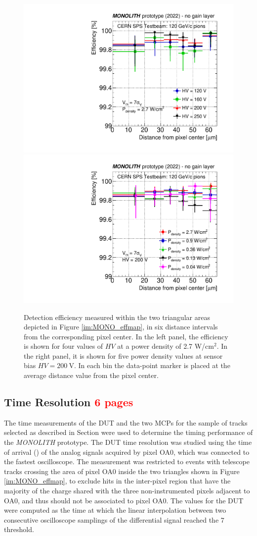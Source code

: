 		\begin{figure}[h]
			\centering 
			\includegraphics[width=.49\textwidth,trim=0 0 0 0]{files/MONOLITH_paper/eff_vs_radius_HV.pdf}
			\includegraphics[width=.49\textwidth,trim=0 0 0 0]{files/MONOLITH_paper/eff_vs_radius_power.pdf}
			\caption{Detection efficiency measured within the two triangular areas depicted in Figure \ref{im:MONO_effmap}, in six distance intervals from the corresponding pixel center. In the left panel, the  efficiency is shown for four values of $HV$ at a power density of 2.7 W/cm$^2$. In the right panel, it is shown for five power density values at sensor bias $HV=\SI{200}{\volt}$.  In each bin the data-point marker is placed at the average distance value from the pixel center.}
			\label{im:MONO_eff_radius} 
		\end{figure}













		\subsection{Time Resolution \textcolor{red}{ 6 pages}}	

		The time measurements of the DUT and the two MCPs for the sample of tracks selected as described in Section  were used to determine the timing performance of the \textit{MONOLITH} prototype. 
		The DUT time resolution was studied using the time of arrival (\toa) of the  analog signals acquired by pixel OA0, which was connected to the fastest oscilloscope. The measurement was restricted to events with telescope tracks crossing the area of pixel OA0 inside the two triangles shown in Figure \ref{im:MONO_effmap}, to exclude hits in the inter-pixel region that have the majority of the charge shared with the three non-instrumented pixels adjacent to OA0, and thus should not be associated to pixel OA0. 
		The \toa values for the DUT were computed as the time at which the linear interpolation between two consecutive oscilloscope samplings of the differential signal reached the 7 \noise threshold. 
		
